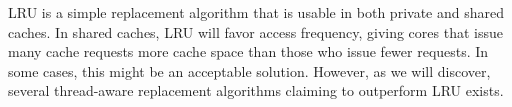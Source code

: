 LRU is a simple replacement algorithm that is usable in both private and shared caches.
In shared caches, LRU will favor access frequency, giving cores that issue many cache requests more cache space than those who issue fewer requests. 
In some cases, this might be an acceptable solution. 
However, as we will discover, several thread-aware replacement algorithms claiming to outperform LRU exists. 


